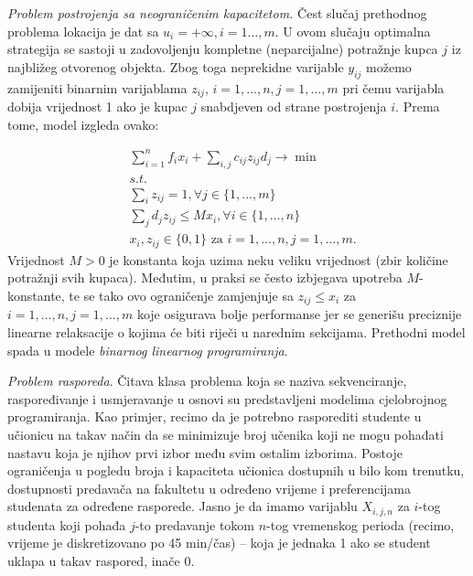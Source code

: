 \documentclass[a4paper, utf8, 11pt, colorlinks]{book}
\begin{document}
\emph{Problem postrojenja sa neograničenim kapacitetom.}
Čest slučaj prethodnog problema lokacija je dat sa  $ u_{i} = + \infty,i=1\ldots,m$. U ovom slučaju optimalna strategija se sastoji u zadovoljenju kompletne (neparcijalne) potražnje kupca $j$ iz najbližeg otvorenog objekta. Zbog toga neprekidne varijable  $y_{ij}$ možemo zamijeniti binarnim varijablama $z_{ij}$, $i=1,\ldots,n, j=1,\ldots,m$ pri čemu varijabla dobija vrijednost 1 ako je kupac $j$ snabdjeven od strane postrojenja $i$. Prema tome, model izgleda ovako:

\begin{align*}
	&\sum_{i=1}^n f_i x_i  + \sum_{i,j} c_{ij} z_{ij} d_j \rightarrow \min\\
	& s.t. \nonumber \\
	& \sum_{i} z_{ij} = 1, \forall j\in\{1,\ldots,m\} \\
	& \sum_{j} d_j z_{ij} \leq M x_i, \forall i \in \{1,\ldots,n\} \\
	& x_i, z_{ij} \in \{0,1\} \mbox{ za } i = 1, \ldots, n, j = 1,  \ldots, m.
\end{align*}
Vrijednost $M>0$ je konstanta koja uzima neku veliku vrijednost (zbir količine potražnji svih kupaca). Međutim, u praksi se često izbjegava upotreba $M$-konstante, te se tako ovo ograničenje zamjenjuje sa $ z_{ij} \leq x_i$ 
za $ i = 1, \ldots, n, j = 1,  \ldots, m$ koje osigurava bolje performanse jer se generišu preciznije linearne relaksacije o kojima će biti riječi u narednim sekcijama. Prethodni model spada u modele \emph{binarnog linearnog programiranja}. 

\emph{Problem rasporeda}. Čitava klasa problema koja se naziva sekvenciranje, raspoređivanje i usmjeravanje u osnovi su predstavljeni modelima cjelobrojnog programiranja. Kao primjer, recimo da je potrebno rasporediti studente u  učionicu na takav način
da se minimizuje broj učenika koji ne mogu pohađati nastavu koja je njihov prvi izbor među svim ostalim izborima. Postoje ograničenja u pogledu broja i kapaciteta učionica dostupnih u bilo kom trenutku, dostupnosti predavača na fakultetu u određeno vrijeme i preferencijama studenata za određene rasporede. Jasno je da imamo varijablu $X_{i,j,n}$ za   $i$-tog studenta 
koji pohađa $j$-to predavanje tokom $n$-tog vremenskog perioda (recimo, vrijeme je diskretizovano po 45 min/čas) -- koja je jednaka 1 ako se student uklapa u takav raspored, inače 0. 
\end{document}
